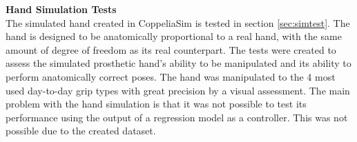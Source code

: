\documentclass[../main.tex]{subfiles}
\begin{document}
\textbf{Hand Simulation Tests}\\
The simulated hand created in CoppeliaSim \cite{coppeliasim} is tested in section \ref{sec:simtest}.
The hand is designed to be anatomically proportional to a real hand, with the same amount of degree of freedom as its real counterpart.
The tests were created to assess the simulated prosthetic hand's ability to be manipulated and its ability to perform anatomically correct poses.
The hand was manipulated to the 4 most used day-to-day grip types with great precision by a visual assessment.
The main problem with the hand simulation is that it was not possible to test its performance using the output of a regression model as a controller.
This was not possible due to the created dataset.






\end{document}
